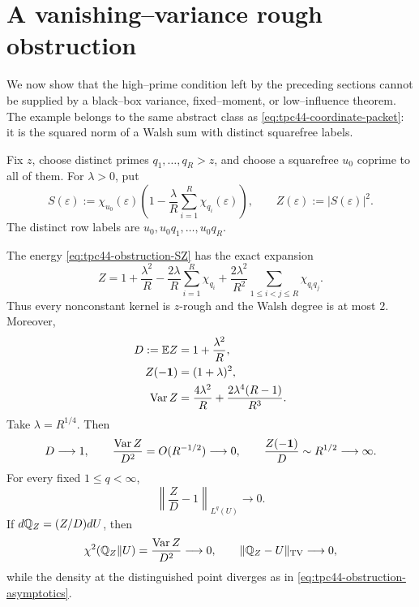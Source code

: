 \section{A vanishing--variance rough obstruction}
\label{sec:tpc44-sharp-obstruction}

We now show that the high--prime condition left by the preceding
sections cannot be supplied by a black--box variance, fixed--moment, or
low--influence theorem.  The example belongs to the same abstract class
as \eqref{eq:tpc44-coordinate-packet}: it is the squared norm of a Walsh
sum with distinct squarefree labels.

Fix \(z\), choose distinct primes \(q_1,\ldots,q_R>z\), and choose a
squarefree \(u_0\) coprime to all of them.  For \(\lambda>0\), put
\begin{equation}
 S(\varepsilon)
 :=\chi_{u_0}(\varepsilon)
 \left(
  1-\frac{\lambda}{R}\sum_{i=1}^{R}\chi_{q_i}(\varepsilon)
 \right),
 \qquad Z(\varepsilon):=|S(\varepsilon)|^2.
 \label{eq:tpc44-obstruction-SZ}
\end{equation}
The distinct row labels are \(u_0,u_0q_1,\ldots,u_0q_R\).

\begin{theorem}
\label{thm:tpc44-rough-obstruction}
The energy \eqref{eq:tpc44-obstruction-SZ} has the exact expansion
\begin{equation}
 Z
 =1+\frac{\lambda^2}{R}
 -\frac{2\lambda}{R}\sum_{i=1}^{R}\chi_{q_i}
 +\frac{2\lambda^2}{R^2}
  \sum_{1\le i<j\le R}\chi_{q_iq_j}.
 \label{eq:tpc44-obstruction-expansion}
\end{equation}
Thus every nonconstant kernel is \(z\)-rough and the Walsh degree is at
most \(2\).  Moreover,
\begin{align}
 D:=\mathbb E Z&=1+\frac{\lambda^2}{R},
 \label{eq:tpc44-obstruction-D}\\
 Z(-\mathbf 1)&=(1+\lambda)^2,
 \label{eq:tpc44-obstruction-corner}\\
 \operatorname{Var}Z
 &=\frac{4\lambda^2}{R}
  +\frac{2\lambda^4(R-1)}{R^3}.
 \label{eq:tpc44-obstruction-variance}
\end{align}
Take \(\lambda=R^{1/4}\).  Then
\begin{equation}
 D\longrightarrow1,
 \qquad
 \frac{\operatorname{Var}Z}{D^2}=O(R^{-1/2})\longrightarrow0,
 \qquad
 \frac{Z(-\mathbf 1)}D\sim R^{1/2}\longrightarrow\infty.
 \label{eq:tpc44-obstruction-asymptotics}
\end{equation}
For every fixed \(1\le q<\infty\),
\begin{equation}
 \left\|\frac ZD-1\right\|_{L^q(U)}\longrightarrow0.
 \label{eq:tpc44-obstruction-fixed-moments}
\end{equation}
If \(d\mathbb Q_Z=(Z/D)dU\), then
\begin{equation}
 \chi^2(\mathbb Q_Z\|U)=\frac{\operatorname{Var}Z}{D^2}\longrightarrow0,
 \qquad
 \|\mathbb Q_Z-U\|_{\rm TV}\longrightarrow0,
 \label{eq:tpc44-obstruction-TV}
\end{equation}
while the density at the distinguished point diverges as in
\eqref{eq:tpc44-obstruction-asymptotics}.
\end{theorem}

